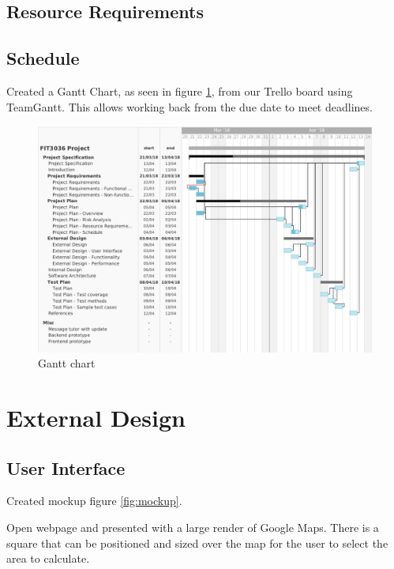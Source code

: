 \documentclass[a4paper,11pt]{article}
\begin{document}

\subsection{Resource Requirements}

\subsection{Schedule}

Created a Gantt Chart, as seen in figure \ref{fig:gantt}, from our Trello board using TeamGantt. This allows working back from the due date to meet deadlines.

\begin{figure}[H]
\includegraphics[width=\textwidth]{gantt-chart}
\caption{Gantt chart}
    \label{fig:gantt}
\end{figure}


\section{External Design}

\subsection{User Interface}

Created mockup figure \ref{fig:mockup}. %

Open webpage and presented with a large render of Google Maps. There is a square that can be positioned and sized over the map for the user to select the area to calculate.
\end{document}
